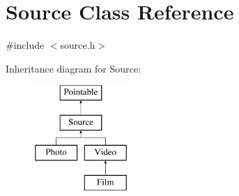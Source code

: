 \hypertarget{classSource}{\section{Source Class Reference}
\label{classSource}
}


{\ttfamily \#include $<$source.\-h$>$}

Inheritance diagram for Source\-:\begin{figure}[H]
\begin{center}
\leavevmode
\includegraphics[height=4.000000cm]{classSource}
\end{center}
\end{figure}

